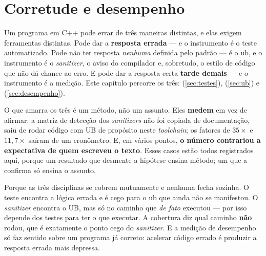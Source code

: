 
\section{Corretude e desempenho}
\label{sec:qualidade}

Um programa em C++ pode errar de três maneiras distintas, e elas exigem
ferramentas distintas. Pode dar a \textbf{resposta errada} --- e o instrumento é
o teste automatizado. Pode não ter resposta \emph{nenhuma} definida pelo padrão
--- é o \gls{ub}, e o instrumento é o \emph{sanitizer}, o aviso do compilador e,
sobretudo, o estilo de código que não dá chance ao erro. E pode dar a resposta
certa \textbf{tarde demais} --- e o instrumento é a medição. Este capítulo
percorre os três:  (\cref{sec:testes}),
 (\cref{sec:ub}) e 
(\cref{sec:desempenho}).

O que amarra os três é um método, não um assunto. Eles \textbf{medem} em vez de
afirmar: a matriz de detecção dos \emph{sanitizers} não foi copiada de
documentação, saiu de rodar código com UB de propósito neste \emph{toolchain};
os fatores de $35\times$ e $11{,}7\times$ saíram de um cronômetro. E, em vários
pontos, \textbf{o número contrariou a expectativa de quem escreveu o texto}.
Esses casos estão todos registrados aqui, porque um resultado que desmente a
hipótese ensina método; um que a confirma só ensina o assunto.

\begin{porque}
Porque as três disciplinas se cobrem mutuamente e nenhuma fecha sozinha. O teste
encontra a lógica errada e é cego para o \gls{ub} que ainda não se manifestou. O
\emph{sanitizer} encontra o UB, mas só no caminho que \emph{de fato} executou ---
por isso depende dos testes para ter o que executar. A cobertura diz qual caminho
\textbf{não} rodou, que é exatamente o ponto cego do \emph{sanitizer}. E a
medição de desempenho só faz sentido sobre um programa já correto: acelerar
código errado é produzir a resposta errada mais depressa.
\end{porque}

